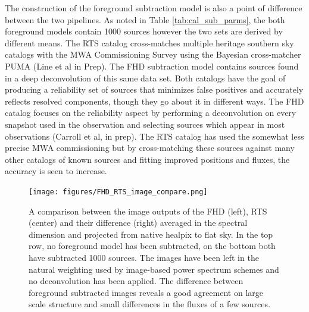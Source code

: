 \documentclass[twolcolumn,iop]{emulateapj}
\begin{document}
The construction of the foreground subtraction model is also a point of difference between the two pipelines.
As noted in Table \ref{tab:cal_sub_parms}, the both foreground models contain 1000 sources however the two sets are derived by different means. The RTS catalog cross-matches multiple heritage southern sky catalogs with the MWA Commissioning Survey using the Bayesian cross-matcher PUMA (Line et al in Prep).  The FHD subtraction model contains sources found in a deep deconvolution of this same data set. Both catalogs have the goal of producing a reliability set of sources that minimizes false positives and accurately reflects resolved components, though they go about it in different ways. The FHD catalog focuses on the reliability aspect by performing a deconvolution on every snapshot used in the observation and selecting sources which appear in most observations (Carroll et al, in prep). The RTS catalog has used the somewhat less precise MWA commissioning but by cross-matching these sources against many other catalogs of known sources and fitting improved positions and fluxes, the accuracy is seen to increase.


\begin{figure}[htb]
\begin{center}
\texttt{[image: figures/FHD\_RTS\_image\_compare.png]}
\caption{A comparison between the image outputs of the FHD (left), RTS (center) and their difference (right) averaged in the spectral dimension and projected from native healpix to flat sky.  In the top row, no foreground model has been subtracted, on the bottom both have subtracted 1000 sources.  The images have been left in the natural weighting used by image-based power spectrum schemes and no deconvolution has been applied. The difference between foreground subtracted images reveals a good agreement on large scale structure and small differences in the fluxes of a few sources.
\label{fig:image_compare}}
\end{center}
\end{figure}
\end{document}
